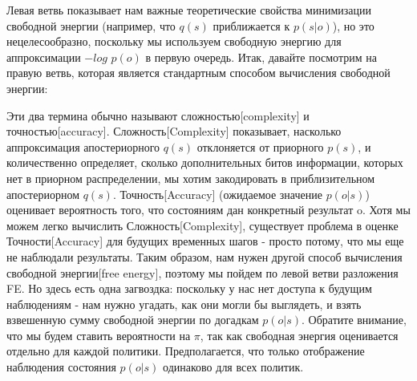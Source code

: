 \documentclass[twoside,leqno, 11pt]{article}
\begin{document}
	\newpage
	
	Левая ветвь показывает нам важные теоретические свойства минимизации свободной энергии (например, что $q(s)$ приближается к $p(s|o)$), но это нецелесообразно, поскольку мы используем свободную энергию для аппроксимации $-log$ $p(o)$ в первую очередь. Итак, давайте посмотрим на правую ветвь, которая является стандартным способом вычисления свободной энергии:
	
	\begin{figure}[h]	
		\label{ris:image}
	\end{figure}
	
	Эти два термина обычно называют сложностью[complexity] и точностью[accuracy]. Сложность[Complexity] показывает, насколько аппроксимация апостериорного $q(s)$ отклоняется от приорного $p(s)$, и количественно определяет, сколько дополнительных битов информации, которых нет в приорном распределении, мы хотим закодировать в приблизительном апостериорном $q(s)$. Точность[Accuracy] (ожидаемое значение $p(o|s)$) оценивает вероятность того, что состояниям дан конкретный результат o. Хотя мы можем легко вычислить Сложность[Complexity], существует проблема в оценке Точности[Accuracy] для будущих временных шагов - просто потому, что мы еще не наблюдали результаты. Таким образом, нам нужен другой способ вычисления свободной энергии[free energy], поэтому мы пойдем по левой ветви разложения FE. Но здесь есть одна загвоздка: поскольку у нас нет доступа к будущим наблюдениям - нам нужно угадать, как они могли бы выглядеть, и взять взвешенную сумму свободной энергии по догадкам $p(o|s)$. Обратите внимание, что мы будем ставить вероятности на $\pi$, так как свободная энергия оценивается отдельно для каждой политики. Предполагается, что только отображение наблюдения состояния $p(o|s)$ одинаково для всех политик.
	
	\begin{figure}[h]	
		\label{ris:image}
	\end{figure}
	
\end{document}
